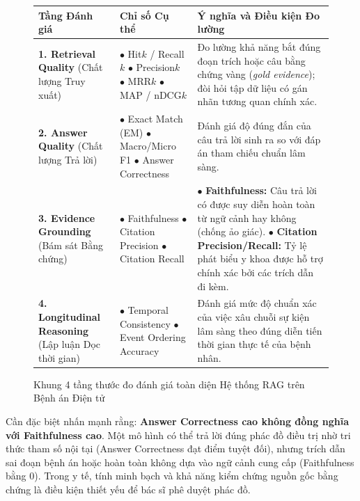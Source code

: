\begin{figure}[H]
\centering
\begin{singlespace}
\fontsize{8.5pt}{10.5pt}\selectfont
\begin{tabular}{|p{3.5cm}|p{5.0cm}|p{5.5cm}|}
\hline
\textbf{Tầng Đánh giá} & \textbf{Chỉ số Cụ thể} & \textbf{Ý nghĩa và Điều kiện Đo lường} \\
\hline
\textbf{1. Retrieval Quality} (Chất lượng Truy xuất) & $\bullet$ Hit\@$k$ / Recall\@$k$ \newline $\bullet$ Precision\@$k$ \newline $\bullet$ MRR\@$k$ \newline $\bullet$ MAP / nDCG\@$k$ & Đo lường khả năng bắt đúng đoạn trích hoặc câu bằng chứng vàng (\emph{gold evidence}); đòi hỏi tập dữ liệu có gán nhãn tương quan chính xác. \\
\hline
\textbf{2. Answer Quality} (Chất lượng Trả lời) & $\bullet$ Exact Match (EM) \newline $\bullet$ Macro/Micro F1 \newline $\bullet$ Answer Correctness & Đánh giá độ đúng đắn của câu trả lời sinh ra so với đáp án tham chiếu chuẩn lâm sàng. \\
\hline
\textbf{3. Evidence Grounding} (Bám sát Bằng chứng) & $\bullet$ Faithfulness \newline $\bullet$ Citation Precision \newline $\bullet$ Citation Recall & $\bullet$ \textbf{Faithfulness:} Câu trả lời có được suy diễn hoàn toàn từ ngữ cảnh hay không (chống ảo giác). \newline $\bullet$ \textbf{Citation Precision/Recall:} Tỷ lệ phát biểu y khoa được hỗ trợ chính xác bởi các trích dẫn đi kèm. \\
\hline
\textbf{4. Longitudinal Reasoning} (Lập luận Dọc thời gian) & $\bullet$ Temporal Consistency \newline $\bullet$ Event Ordering Accuracy & Đánh giá mức độ chuẩn xác của việc xâu chuỗi sự kiện lâm sàng theo đúng diễn tiến thời gian thực tế của bệnh nhân. \\
\hline
\end{tabular}
\end{singlespace}
\caption{Khung 4 tầng thước đo đánh giá toàn diện Hệ thống RAG trên Bệnh án Điện tử}
\label{fig:rag_metrics}
\end{figure}

\noindent Cần đặc biệt nhấn mạnh rằng: \textbf{Answer Correctness cao không đồng nghĩa với Faithfulness cao}. Một mô hình có thể trả lời đúng phác đồ điều trị nhờ tri thức tham số nội tại (Answer Correctness đạt điểm tuyệt đối), nhưng trích dẫn sai đoạn bệnh án hoặc hoàn toàn không dựa vào ngữ cảnh cung cấp (Faithfulness bằng 0). Trong y tế, tính minh bạch và khả năng kiểm chứng nguồn gốc bằng chứng là điều kiện thiết yếu để bác sĩ phê duyệt phác đồ.

